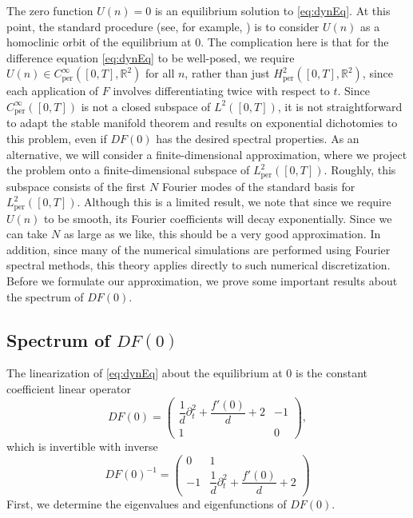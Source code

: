 \documentclass[12pt,reqno]{amsart}
\def\R{{\mathbb R}}
\def\per{\textrm{per}}
\theoremstyle{definition}
\begin{document}
The zero function $U(n) = 0$ is an equilibrium solution to \cref{eq:dynEq}. At this point, the standard procedure (see, for example, \cites{Parker2021,Parker2020,Sandstede1998}) is to consider $U(n)$ as a homoclinic orbit of the equilibrium at 0. The complication here is that for the difference equation \cref{eq:dynEq} to be well-posed, we require $U(n) \in C_\per^\infty([0,T],\R^2)$ for all $n$, rather than just $H^2_\per([0,T], \R^2)$, since each application of $F$ involves differentiating twice with respect to $t$. Since $C_\per^\infty([0,T])$ is not a closed subspace of $L^2([0,T])$, it is not straightforward to adapt the stable manifold theorem and results on exponential dichotomies to this problem, even if $DF(0)$ has the desired spectral properties. As an alternative, we will consider a finite-dimensional approximation, where we project the problem onto a finite-dimensional subspace of $L_\per^2([0,T])$. Roughly, this subspace consists of the first $N$ Fourier modes of the standard basis for $L_\per^2([0,T])$. Although this is a limited result, we note that since we require $U(n)$ to be smooth, its Fourier coefficients will decay exponentially. Since we can take $N$ as large as we like, this should be a very good approximation. In addition, since many of the numerical simulations are performed using Fourier spectral methods, this theory applies directly to such numerical discretization. Before we formulate our approximation, we prove some important results about the spectrum of $DF(0)$.

\subsection{Spectrum of \texorpdfstring{$DF(0)$}{DF(0)}}

The linearization of \cref{eq:dynEq} about the equilibrium at 0 is the constant coefficient linear operator 
\begin{equation}\label{eq:DF0}
DF(0) = \begin{pmatrix}
\dfrac{1}{d}\partial_t^2 + \dfrac{f'(0)}{d} + 2 & -1 \\ 1 & 0
\end{pmatrix},
\end{equation}
which is invertible with inverse
\begin{equation}\label{eq:DF0inv}
DF(0)^{-1} = \begin{pmatrix}
0 & 1 \\ -1 & \dfrac{1}{d}\partial_t^2 + \dfrac{f'(0)}{d} + 2
\end{pmatrix}
\end{equation}
First, we determine the eigenvalues and eigenfunctions of $DF(0)$.
\end{document}
